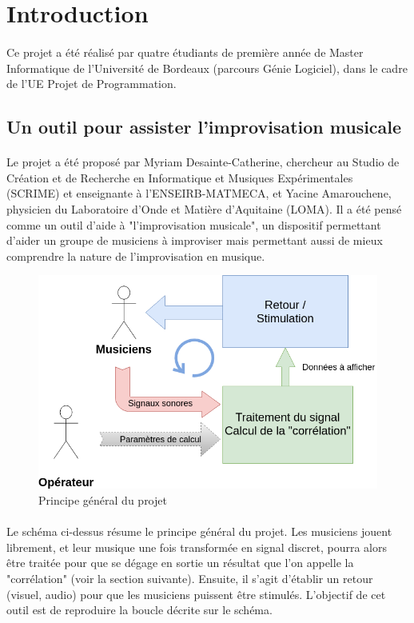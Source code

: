 \newpage
\section{Introduction}
\paragraph{}
Ce projet a été réalisé par quatre étudiants de première année de
Master Informatique de l'Université de Bordeaux (parcours Génie
Logiciel), dans le cadre de l'UE Projet de Programmation.

\subsection{Un outil pour assister l'improvisation musicale}
\paragraph{}
Le projet a été proposé par Myriam Desainte-Catherine, chercheur au
Studio de Création et de Recherche en Informatique et Musiques
Expérimentales (SCRIME) et enseignante à l'ENSEIRB-MATMECA, et Yacine
Amarouchene, physicien du Laboratoire d'Onde et Matière d'Aquitaine
(LOMA). Il a été pensé comme un outil d'aide à "l'improvisation
musicale", un dispositif permettant d'aider un groupe de musiciens à
improviser mais permettant aussi de mieux comprendre la nature de
l'improvisation en musique.

\begin{figure}[H]
      \centering
      \includegraphics[scale=0.5]{assets/principe_global.png}
      \caption{Principe général du projet}
      \label{principe général}
\end{figure}
\paragraph{}
Le schéma ci-dessus résume le principe général du projet. Les
musiciens jouent librement, et leur musique une fois transformée en
signal discret, pourra alors être traitée pour que se dégage en sortie
un résultat que l'on appelle la "corrélation" (voir la section
suivante). Ensuite, il s'agit d'établir un retour (visuel, audio) pour
que les musiciens puissent être stimulés. L'objectif de cet outil est
de reproduire la boucle décrite sur le schéma.

